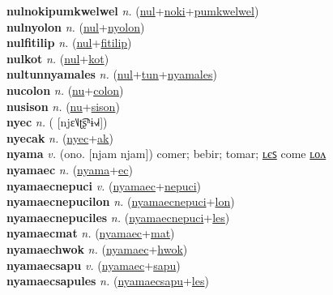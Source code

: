 \textbf{nulnokipumkwelwel} \textit{n.} (\hyperref[nul]{nul}+\hyperref[noki]{noki}+\hyperref[pumkwelwel]{pumkwelwel})
 \label{nulnokipumkwelwel} \\
\textbf{nulnyolon} \textit{n.} (\hyperref[nul]{nul}+\hyperref[nyolon]{nyolon})
 \label{nulnyolon} \\
\textbf{nulfitilip} \textit{n.} (\hyperref[nul]{nul}+\hyperref[fitilip]{fitilip})
 \label{nulfitilip} \\
\textbf{nulkot} \textit{n.} (\hyperref[nul]{nul}+\hyperref[kot]{kot})
 \label{nulkot} \\
\textbf{nultunnyamales} \textit{n.} (\hyperref[nul]{nul}+\hyperref[tun]{tun}+\hyperref[nyamales]{nyamales})
 \label{nultunnyamales} \\
\textbf{nucolon} \textit{n.} (\hyperref[nu]{nu}+\hyperref[colon]{colon})
 \label{nucolon} \\
\textbf{nusison} \textit{n.} (\hyperref[nu]{nu}+\hyperref[sison]{sison})
 \label{nusison} \\
\textbf{nyec} \textit{n.} ( [njɛ˥˩ʈ͡ʂʰɨ˧˩˧])
 \label{nyec} \\
\textbf{nyecak} \textit{n.} (\hyperref[nyec]{nyec}+\hyperref[ak]{ak})
 \label{nyecak} \\
\textbf{nyama} \textit{v.} (ono. [njam njam])
comer; bebir; tomar; \hyperref[nyamales]{ʟєꜱ} come \hyperref[nyamalon]{ʟᴏᴧ} \label{nyama} \\
\textbf{nyamaec} \textit{n.} (\hyperref[nyama]{nyama}+\hyperref[ec]{ec})
 \label{nyamaec} \\
\textbf{nyamaecnepuci} \textit{v.} (\hyperref[nyamaec]{nyamaec}+\hyperref[nepuci]{nepuci})
 \label{nyamaecnepuci} \\
\textbf{nyamaecnepucilon} \textit{n.} (\hyperref[nyamaecnepuci]{nyamaecnepuci}+\hyperref[lon]{lon})
 \label{nyamaecnepucilon} \\
\textbf{nyamaecnepuciles} \textit{n.} (\hyperref[nyamaecnepuci]{nyamaecnepuci}+\hyperref[les]{les})
 \label{nyamaecnepuciles} \\
\textbf{nyamaecmat} \textit{n.} (\hyperref[nyamaec]{nyamaec}+\hyperref[mat]{mat})
 \label{nyamaecmat} \\
\textbf{nyamaechwok} \textit{n.} (\hyperref[nyamaec]{nyamaec}+\hyperref[hwok]{hwok})
 \label{nyamaechwok} \\
\textbf{nyamaecsapu} \textit{v.} (\hyperref[nyamaec]{nyamaec}+\hyperref[sapu]{sapu})
 \label{nyamaecsapu} \\
\textbf{nyamaecsapules} \textit{n.} (\hyperref[nyamaecsapu]{nyamaecsapu}+\hyperref[les]{les})
